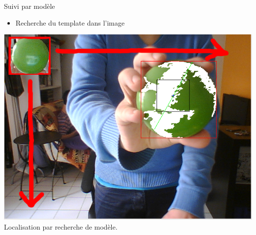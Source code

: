 \documentclass{beamer}
\begin{document}
            \begin{frame}{Suivi par modèle}
                  \begin{itemize}
                        \item{Recherche du template dans l'image}
                  \end{itemize}
		  \begin{center}
                        \includegraphics[scale=0.25]{Capture8.png}\\
                        Localisation par recherche de modèle.
                  \end{center}
            \end{frame}
            
\end{document}
